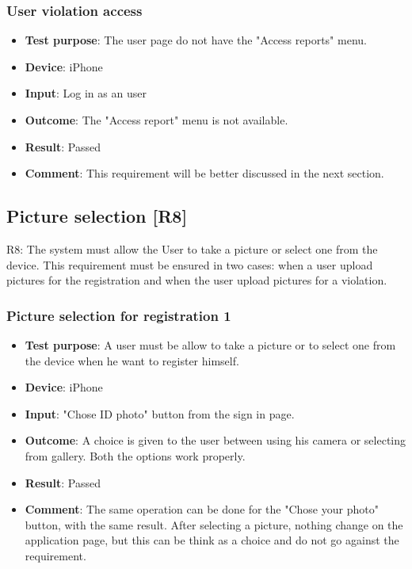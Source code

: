 \documentclass[../ATD.tex]{subfiles}
\begin{document}
    \subsubsection{User violation access}\label{subsubsec:user-violation-access}
    \begin{itemize}
        \item \textbf{Test purpose}: The user page do not have the "Access reports" menu.
        \item \textbf{Device}: iPhone
        \item \textbf{Input}: Log in as an user
        \item \textbf{Outcome}: The "Access report" menu is not available.
        \item \textbf{Result}: Passed
        \item \textbf{Comment}: This requirement will be better discussed in the next section.
    \end{itemize}

    \subsection{Picture selection [R8]}\label{subsec:picture-selection}
    R8: The system must allow the User to take a picture or select one from the device.
    This requirement must be ensured in two cases: when a user upload pictures for the registration and when the user upload pictures for a violation.

    \subsubsection{Picture selection for registration 1}\label{subsubsec:picture-selection-for-registration-1}
    \begin{itemize}
        \item \textbf{Test purpose}: A user must be allow to take a picture or to select one from the device when he want to register himself.
        \item \textbf{Device}: iPhone
        \item \textbf{Input}: "Chose ID photo" button from the sign in page.
        \item \textbf{Outcome}: A choice is given to the user between using his camera or selecting from gallery.
        Both the options work properly.
        \item \textbf{Result}: Passed
        \item \textbf{Comment}: The same operation can be done for the "Chose your photo" button, with the same result.
        After selecting a picture, nothing change on the application page, but this can be think as a choice and do not go against the requirement.
    \end{itemize}
\end{document}
